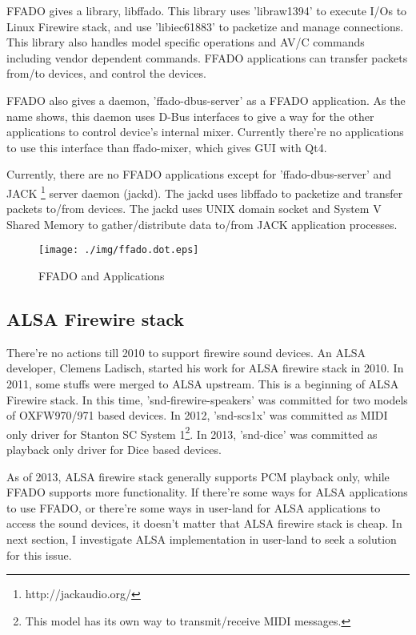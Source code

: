 \documentclass[onecolumn]{article}
\begin{document}
FFADO gives a library, libffado. This library uses 'libraw1394' to execute I/Os to Linux Firewire stack, and use 'libiec61883' to packetize and manage connections. This library also handles model specific operations and AV/C commands including vendor dependent commands. FFADO applications can transfer packets from/to devices, and control the devices.

FFADO also gives a daemon, 'ffado-dbus-server' as a FFADO application. As the name shows, this daemon uses D-Bus interfaces to give a way for the other applications to control device's internal mixer. Currently there're no applications to use this interface than ffado-mixer, which gives GUI with Qt4.

Currently, there are no FFADO applications except for 'ffado-dbus-server' and JACK \footnote{http://jackaudio.org/} server daemon (jackd). The jackd uses libffado to packetize and transfer packets to/from devices. The jackd uses UNIX domain socket and System V Shared Memory to gather/distribute data to/from JACK application processes. 

\begin{figure}[H]
	\centering
	\texttt{[image: ./img/ffado.dot.eps]}
	\caption{{FFADO and Applications}}
	\label{ffado_apps}
\end{figure}

\subsection{ALSA Firewire stack}
There're no actions till 2010 to support firewire sound devices. An ALSA developer, Clemens Ladisch, started his work for ALSA firewire stack in 2010. In 2011, some stuffs were merged to ALSA upstream. This is a beginning of ALSA Firewire stack. In this time, 'snd-firewire-speakers' was committed for two models of OXFW970/971 based devices. In 2012, 'snd-scs1x' was committed as MIDI only driver for Stanton SC System 1\footnote{This model has its own way to transmit/receive MIDI messages.}. In 2013, 'snd-dice' was committed as playback only driver for Dice based devices.

As of 2013, ALSA firewire stack generally supports PCM playback only, while FFADO supports more functionality. If there're some ways for ALSA applications to use FFADO, or there're some ways in user-land for ALSA applications to access the sound devices, it doesn't matter that ALSA firewire stack is cheap. In next section, I investigate ALSA implementation in user-land to seek a solution for this issue.
\end{document}
